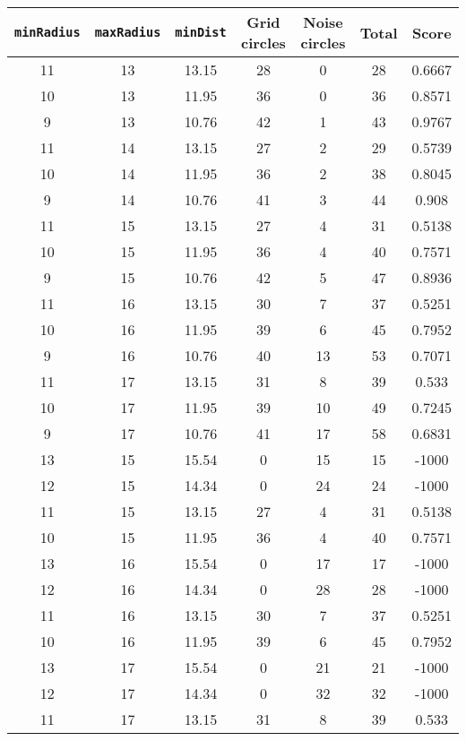 \documentclass[letterpaper, 12pt]{article}
\begin{document}
\begin{longtable}{|c|c|c|c|c|c|c|}
\hline
\textbf{\texttt{minRadius}} & \textbf{\texttt{maxRadius}} & \textbf{\texttt{minDist}} & \textbf{Grid circles} & \textbf{Noise circles} & \textbf{Total} & \textbf{Score} \\
\hline
11 & 13 & 13.15 & 28 & 0 & 28 & 0.6667 \\
\hline
10 & 13 & 11.95 & 36 & 0 & 36 & 0.8571 \\
\hline
9 & 13 & 10.76 & 42 & 1 & 43 & 0.9767 \\
\hline
11 & 14 & 13.15 & 27 & 2 & 29 & 0.5739 \\
\hline
10 & 14 & 11.95 & 36 & 2 & 38 & 0.8045 \\
\hline
9 & 14 & 10.76 & 41 & 3 & 44 & 0.908 \\
\hline
11 & 15 & 13.15 & 27 & 4 & 31 & 0.5138 \\
\hline
10 & 15 & 11.95 & 36 & 4 & 40 & 0.7571 \\
\hline
9 & 15 & 10.76 & 42 & 5 & 47 & 0.8936 \\
\hline
11 & 16 & 13.15 & 30 & 7 & 37 & 0.5251 \\
\hline
10 & 16 & 11.95 & 39 & 6 & 45 & 0.7952 \\
\hline
9 & 16 & 10.76 & 40 & 13 & 53 & 0.7071 \\
\hline
11 & 17 & 13.15 & 31 & 8 & 39 & 0.533 \\
\hline
10 & 17 & 11.95 & 39 & 10 & 49 & 0.7245 \\
\hline
9 & 17 & 10.76 & 41 & 17 & 58 & 0.6831 \\
\hline
13 & 15 & 15.54 & 0 & 15 & 15 & -1000 \\
\hline
12 & 15 & 14.34 & 0 & 24 & 24 & -1000 \\
\hline
11 & 15 & 13.15 & 27 & 4 & 31 & 0.5138 \\
\hline
10 & 15 & 11.95 & 36 & 4 & 40 & 0.7571 \\
\hline
13 & 16 & 15.54 & 0 & 17 & 17 & -1000 \\
\hline
12 & 16 & 14.34 & 0 & 28 & 28 & -1000 \\
\hline
11 & 16 & 13.15 & 30 & 7 & 37 & 0.5251 \\
\hline
10 & 16 & 11.95 & 39 & 6 & 45 & 0.7952 \\
\hline
13 & 17 & 15.54 & 0 & 21 & 21 & -1000 \\
\hline
12 & 17 & 14.34 & 0 & 32 & 32 & -1000 \\
\hline
11 & 17 & 13.15 & 31 & 8 & 39 & 0.533 \\
\hline

\end{longtable}
\end{document}
